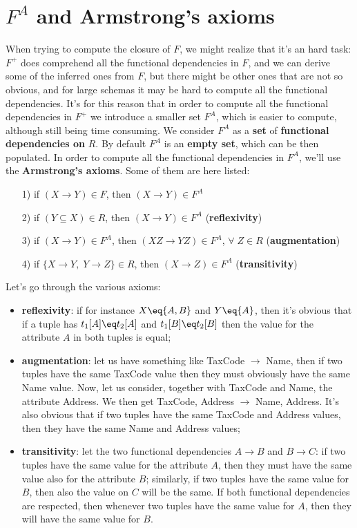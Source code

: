\section{$F^A$ and Armstrong's axioms}

When trying to compute the closure of $F$, we might realize that it's an hard task: $F^+$ does comprehend all the functional dependencies in $F$, and we can derive some of the inferred ones from $F$, but there might be other ones that are not so obvious, and for large schemas it may be hard to compute all the functional dependencies. It's for this reason that in order to compute all the functional dependencies in $F^+$ we introduce a smaller set $F^A$, which is easier to compute, although still being time consuming. We consider $F^A$ as a \textbf{set} of \textbf{functional dependencies on} $R$. By default $F^A$ is an \textbf{empty set}, which can be then populated.
\nwl
In order to compute all the functional dependencies in $F^A$, we'll use the \textbf{Armstrong's axioms}. Some of them are here listed:
\begin{question}
    \begin{itemize}
        \item [1)] if $(X \rightarrow Y) \in F$, then $(X \rightarrow Y) \in F^A$
        \item [2)] if $(Y \subseteq X) \in R$, then $(X \rightarrow Y) \in F^A$ (\textbf{reflexivity})
        \item [3)] if $(X \rightarrow Y) \in F^A$, then $(XZ \rightarrow YZ) \in F^A$, $\forall \; Z \in R$ (\textbf{augmentation})
        \item [4)] if $\{X \rightarrow Y, \; Y \rightarrow Z\} \in R$, then $(X \rightarrow Z) \in F^A$ (\textbf{transitivity})
    \end{itemize}
\end{question}

Let's go through the various axioms:
\begin{itemize}
    \item \textbf{reflexivity}: if for instance $X \eq \{A, B\}$ and $Y \eq \{A\}$, then it's obvious that if a tuple has $t_1[A] \eq t_2[A]$ and $t_1[B] \eq t_2[B]$ then the value for the attribute $A$ in both tuples is equal;
    \item \textbf{augmentation}: let us have something like TaxCode $\rightarrow$ Name, then if two tuples have the same TaxCode value then they must obviously have the same Name value. Now, let us consider, together with TaxCode and Name, the attribute Address. We then get TaxCode, Address $\rightarrow$ Name, Address. It's also obvious that if two tuples have the same TaxCode and Address values, then they have the same Name and Address values;
    \item \textbf{transitivity}: let the two functional dependencies $A \rightarrow B$ and $B \rightarrow C$: if two tuples have the same value for the attribute $A$, then they must have the same value also for the attribute $B$; similarly, if two tuples have the same value for $B$, then also the value on $C$ will be the same. If both functional dependencies are respected, then whenever two tuples have the same value for $A$, then they will have the same value for $B$.
\end{itemize}

